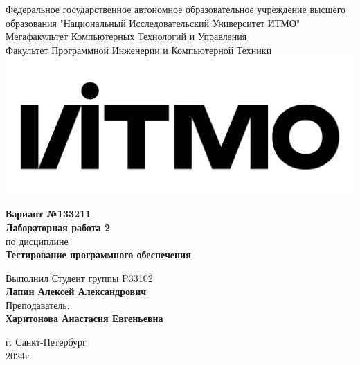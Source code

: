 \documentclass[12pt,onecolumn]{article}
\begin{document}
\setcounter{tocdepth}{4}
\begin{center}
    Федеральное государственное автономное образовательное учреждение высшего образования "Национальный Исследовательский Университет ИТМО"\\ 
    Мегафакультет Компьютерных Технологий и Управления\\
    Факультет Программной Инженерии и Компьютерной Техники \\
    \includegraphics[scale=0.3]{image/itmo.jpg} %
\end{center}
\vspace{1cm}


\begin{center}
    \large \textbf{Вариант №133211}\\
    \textbf{Лабораторная работа 2}\\
    по дисциплине\\
    \textbf{Тестирование программного обеспечения}
\end{center}

\vspace{2cm}

\begin{flushright}
  Выполнил Студент  группы P33102\\
  \textbf{Лапин Алексей Александрович}\\
  Преподаватель: \\
  \textbf{Харитонова Анастасия Евгеньевна}\\
\end{flushright}

\vspace{9cm}
\begin{center}
    г. Санкт-Петербург\\
    2024г.
\end{center}
\pagestyle{empty}

\pagestyle{plain}
\end{document}
